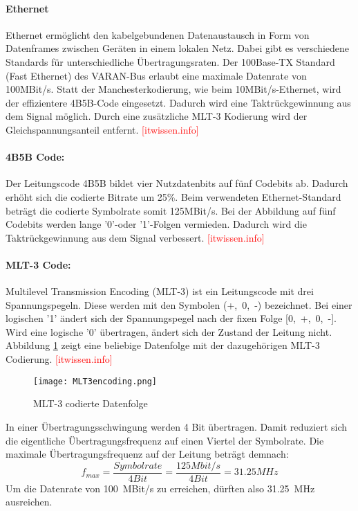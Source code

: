 \paragraph{Ethernet}
Ethernet ermöglicht den kabelgebundenen Datenaustausch in Form von Datenframes zwischen Geräten in einem lokalen Netz. Dabei gibt es verschiedene Standards für unterschiedliche Übertragungsraten. Der 100Base-TX Standard (Fast Ethernet) des VARAN-Bus erlaubt eine maximale Datenrate von 100MBit/s. Statt der Manchesterkodierung, wie beim 10MBit/s-Ethernet, wird der effizientere 4B5B-Code eingesetzt. Dadurch wird eine Taktrückgewinnung aus dem Signal möglich. Durch eine zusätzliche MLT-3 Kodierung wird der Gleichspannungsanteil entfernt. \textcolor{red}{[itwissen.info]}

\paragraph{4B5B Code:}
Der Leitungscode 4B5B bildet vier Nutzdatenbits auf fünf Codebits ab. Dadurch erhöht sich die codierte Bitrate um 25\%. Beim verwendeten Ethernet-Standard beträgt die codierte Symbolrate somit 125MBit/s. Bei der Abbildung auf fünf Codebits werden lange '0'-oder '1'-Folgen vermieden. Dadurch wird die Taktrückgewinnung aus dem Signal verbessert. \textcolor{red}{[itwissen.info]}

\paragraph{MLT-3 Code:}
Multilevel Transmission Encoding (MLT-3) ist ein Leitungscode mit drei Spannungspegeln. Diese werden mit den Symbolen (+,\ 0,\ -) bezeichnet. Bei einer logischen '1' ändert sich der Spannungspegel nach der fixen Folge [0,\ +,\ 0,\ -]. Wird eine logische '0' übertragen, ändert sich der Zustand der Leitung nicht. Abbildung \ref{fig:MLT3code} zeigt eine beliebige Datenfolge mit der dazugehörigen MLT-3 Codierung. \textcolor{red}{[itwissen.info]}
\begin{figure}[h]
\centering
\texttt{[image: MLT3encoding.png]}
\caption{MLT-3 codierte Datenfolge}\label{fig:MLT3code}
\end{figure}

In einer Übertragungsschwingung werden 4 Bit übertragen. Damit reduziert sich die eigentliche Übertragungsfrequenz auf einen Viertel der Symbolrate. Die maximale Übertragungsfrequenz auf der Leitung beträgt demnach: 
\begin{equation}\label{eq:MLT3}
f_{max}=\frac{Symbolrate}{4 Bit}=\frac{125Mbit/s}{4 Bit}=31.25 MHz
\end{equation}
Um die Datenrate von \SI{100}{MBit/s} zu erreichen, dürften also \SI{31.25}{MHz} ausreichen.

